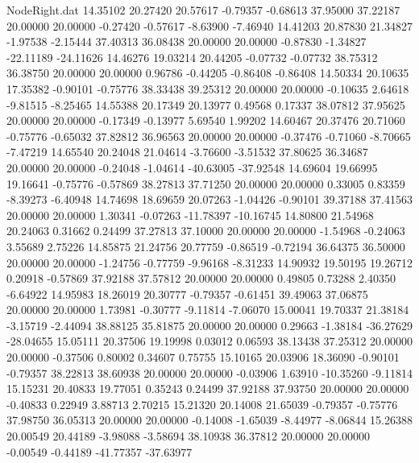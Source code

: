 \begin{filecontents}{NodeRight.dat}
  14.35102   20.27420   20.57617    -0.79357   -0.68613   37.95000   37.22187   20.00000   20.00000   -0.27420   -0.57617   -8.63900   -7.46940
  14.41203   20.87830   21.34827    -1.97538   -2.15444   37.40313   36.08438   20.00000   20.00000   -0.87830   -1.34827  -22.11189  -24.11626
  14.46276   19.03214   20.44205    -0.07732   -0.07732   38.75312   36.38750   20.00000   20.00000    0.96786   -0.44205   -0.86408   -0.86408
  14.50334   20.10635   17.35382    -0.90101   -0.75776   38.33438   39.25312   20.00000   20.00000   -0.10635    2.64618   -9.81515   -8.25465
  14.55388   20.17349   20.13977     0.49568    0.17337   38.07812   37.95625   20.00000   20.00000   -0.17349   -0.13977    5.69540    1.99202
  14.60467   20.37476   20.71060    -0.75776   -0.65032   37.82812   36.96563   20.00000   20.00000   -0.37476   -0.71060   -8.70665   -7.47219
  14.65540   20.24048   21.04614    -3.76600   -3.51532   37.80625   36.34687   20.00000   20.00000   -0.24048   -1.04614  -40.63005  -37.92548
  14.69604   19.66995   19.16641    -0.75776   -0.57869   38.27813   37.71250   20.00000   20.00000    0.33005    0.83359   -8.39273   -6.40948
  14.74698   18.69659   20.07263    -1.04426   -0.90101   39.37188   37.41563   20.00000   20.00000    1.30341   -0.07263  -11.78397  -10.16745
  14.80800   21.54968   20.24063     0.31662    0.24499   37.27813   37.10000   20.00000   20.00000   -1.54968   -0.24063    3.55689    2.75226
  14.85875   21.24756   20.77759    -0.86519   -0.72194   36.64375   36.50000   20.00000   20.00000   -1.24756   -0.77759   -9.96168   -8.31233
  14.90932   19.50195   19.26712     0.20918   -0.57869   37.92188   37.57812   20.00000   20.00000    0.49805    0.73288    2.40350   -6.64922
  14.95983   18.26019   20.30777    -0.79357   -0.61451   39.49063   37.06875   20.00000   20.00000    1.73981   -0.30777   -9.11814   -7.06070
  15.00041   19.70337   21.38184    -3.15719   -2.44094   38.88125   35.81875   20.00000   20.00000    0.29663   -1.38184  -36.27629  -28.04655
  15.05111   20.37506   19.19998     0.03012    0.06593   38.13438   37.25312   20.00000   20.00000   -0.37506    0.80002    0.34607    0.75755
  15.10165   20.03906   18.36090    -0.90101   -0.79357   38.22813   38.60938   20.00000   20.00000   -0.03906    1.63910  -10.35260   -9.11814
  15.15231   20.40833   19.77051     0.35243    0.24499   37.92188   37.93750   20.00000   20.00000   -0.40833    0.22949    3.88713    2.70215
  15.21320   20.14008   21.65039    -0.79357   -0.75776   37.98750   36.05313   20.00000   20.00000   -0.14008   -1.65039   -8.44977   -8.06844
  15.26388   20.00549   20.44189    -3.98088   -3.58694   38.10938   36.37812   20.00000   20.00000   -0.00549   -0.44189  -41.77357  -37.63977

\end{filecontents}
